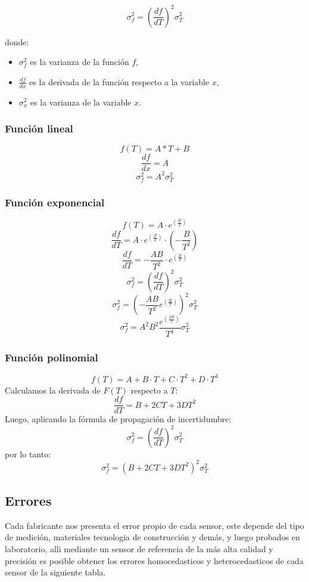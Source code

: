 \documentclass[conference]{IEEEtran}
\begin{document}
\begin{equation}
	\sigma_f^2 = \left( \frac{df}{dT} \right)^2 \sigma_T^2
\end{equation}

donde:
\begin{itemize}
	\item $\sigma_f^2$ es la varianza de la funci\'on $f$,
	\item $\frac{d f}{d x}$ es la derivada de la funci\'on respecto a la variable $x$,
	\item $\sigma_x^2$ es la varianza de la variable $x$.
\end{itemize}



\subsubsection{Funci\'on lineal}
	\[
		f(T) = A * T + B
	\]
	\[
		\frac{d f}{d x} = A
	\]
	\[
		\sigma_f^2 = A^2 \sigma_T^2
	\]

\subsubsection{Funci\'on exponencial}
	\[
	f(T) = A \cdot e^{\left( \frac{B}{T} \right)}
	\]
	\[
	\frac{d f}{d T} = A \cdot e^{\left( \frac{B}{T} \right)} \cdot \left( -\frac{B}{T^2} \right)
	\]
	\[
	\frac{d f}{d T} = -\frac{A B}{T^2} \cdot e^{\left( \frac{B}{T} \right)}
	\]
	\[
	\sigma_f^2 = \left( \frac{d f}{d T} \right)^2 \sigma_T^2
	\]
	\[
	\sigma_f^2 = \left( -\frac{A B}{T^2} e^{\left( \frac{B}{T} \right)} \right)^2 \sigma_T^2
	\]
	\[
	\sigma_f^2 = A^2 B^2 \frac{e^{\left( \frac{2B}{T} \right)}}{T^4} \sigma_T^2
	\]

\subsubsection{Funci\'on polinomial}
	
	\[
	f(T) = A + B \cdot T + C \cdot T^2 + D \cdot T^3
	\]
	Calculamos la derivada de \( F(T) \) respecto a \( T \):
	\[
	\frac{d f}{d T} = B + 2 C T + 3 D T^2
	\]
	Luego, aplicando la fórmula de propagación de incertidumbre:
	\[
	\sigma_f^2 = \left( \frac{d f}{d T} \right)^2 \sigma_T^2
	\]
	por lo tanto:
	\[
	\sigma_f^2 = \left( B + 2 C T + 3 D T^2 \right)^2 \sigma_T^2
	\]
	

\subsection{Errores}
	Cada fabricante nos presenta el error propio de cada sensor, este depende del tipo de medición, materiales tecnologia de construcción y demás, y luego probados en laboratorio, alli mediante un sensor de referencia de la más alta calidad y precisión es posible obtener los errores homocedasticos y heterocedasticos de cada sensor de la siguiente tabla.
	
\end{document}

